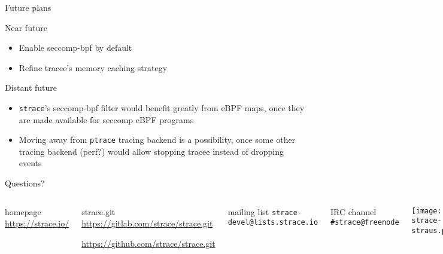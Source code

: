 \documentclass[unicode,aspectratio=169]{beamer}
\begin{document}
\begin{frame}[fragile]{Future plans}
\begin{block}{Near future}
\begin{itemize}
  \item Enable seccomp-bpf by default
  \item Refine tracee's memory caching strategy
\end{itemize}
\end{block}
\begin{block}{Distant future}
\begin{itemize}
  \item \texttt{strace}'s seccomp-bpf filter would benefit greatly from eBPF
        maps, once they are made available for seccomp eBPF programs
  \item Moving away from \texttt{ptrace} tracing backend is a possibility, once
        some other tracing backend (perf?) would allow stopping tracee instead
	of dropping events\footnotemark[1]\footnotemark[2]
\end{itemize}
\end{block}
\end{frame}

{
\begin{frame}{Questions?}
	\begin{columns}
		\column{7.5cm}
\begin{block}{\large homepage}
	\url{https://strace.io/}
\end{block}
\begin{block}{\large strace.git}
	\url{https://gitlab.com/strace/strace.git}

	\url{https://github.com/strace/strace.git}
\end{block}
\begin{block}{\large mailing list}
	\texttt{strace-devel@lists.strace.io}
\end{block}
\begin{block}{\large IRC channel}
	\texttt{\#strace@freenode}
\end{block}
		\column{2.8cm}
			\centerline{\texttt{[image: strace-straus.pdf]}}
	\end{columns}
\end{frame}
}
\end{document}

